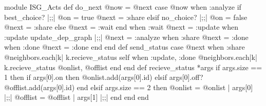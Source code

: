 \begin{rubyblock}
module ISG_Acts
  def do_next
    @now = @next
    case @now
    when :analyze
      if best_choice? |;\label{code:bestchoice-call};|
        @on = true
        @next = :share
      elsif no_choice? |;\label{code:nochoice-call};|
        @on = false
        @next = :share
      else
        @next = :wait
      end
    when :wait
      @next = :update
    when :update
      update_dep_graph |;\label{code:update-call};|
      @next = :analyze
    when :share
      @next = :done
    when :done
      @next = :done
    end      
  end
  def send_status
    case @next
    when :share
      @neighbors.each{|k| k.recieve_status self}
    when :update, :done
      @neighbors.each{|k| k.recieve_status @onlist, @offlist}
    end
  end
  def recieve_status *args
    if args.size == 1 then
      if args[0].on then
        @onlist.add(args[0].id)
      elsif args[0].off?
        @offlist.add(args[0].id)
      end
    elsif args.size == 2 then
      @onlist = @onlist | args[0] |;\label{code:union-1};|
      @offlist = @offlist | args[1] |;\label{code:union-2};|
    end
  end
end
\end{rubyblock}
